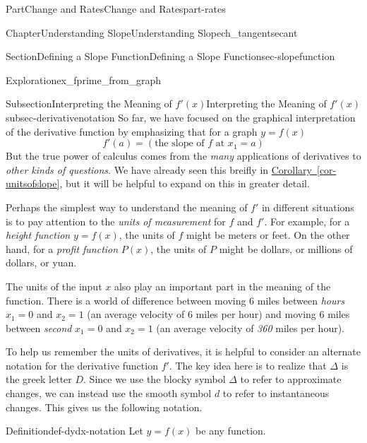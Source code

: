 \documentclass[oneside,10pt,]{tufte-book}
\newcommand{\xreffont}{\relax}
\numberwithin{equation}{chapter}
\begin{document}
\begin{partptx}{Part}{Change and Rates}{}{Change and Rates}{}{}{part-rates}
\begin{chapterptx}{Chapter}{Understanding Slope}{}{Understanding Slope}{}{}{ch_tangentsecant}
\begin{sectionptx}{Section}{Defining a Slope Function}{}{Defining a Slope Function}{}{}{sec-slopefunction}
\begin{exploration}{Exploration}{}{ex_fprime_from_graph}
\begin{enumerate}[font=\bfseries,label=(\alph*),ref=\alph*]
\begin{image}{0.125}{0.75}{0.125}{}
{\begin{tikzpicture}
\end{tikzpicture}
}%
\end{image}%
\end{enumerate}%
\end{exploration}%
%
%
\typeout{************************************************}
\typeout{************************************************}
%
\begin{subsectionptx}{Subsection}{Interpreting the Meaning of \(f'(x)\)}{}{Interpreting the Meaning of \(f'(x)\)}{}{}{subsec-derivativenotation}
So far, we have focused on the graphical interpretation of the derivative function by emphasizing that for a graph \(y=f(x)\)%
\begin{equation*}
f'(a) = (\text{the slope of } f \text{ at }x_1=a)
\end{equation*}
But the true power of calculus comes from the \emph{many} applications of derivatives to \emph{other kinds of questions}. We have already seen this breifly in \hyperref[cor-unitsofslope]{Corollary~{\xreffont\ref{cor-unitsofslope}}}, but it will be helpful to expand on this in greater detail.%
\par
Perhaps the simplest way to understand the meaning of \(f'\) in different situations is to pay attention to the \emph{units of measurement} for \(f\) and \(f'\). For example, for a \emph{height function} \(y=f(x)\), the units of \(f\) might be meters or feet. On the other hand, for a \emph{profit function} \(P(x)\), the units of \(P\) might be dollars, or millions of dollars, or yuan.%
\par
The units of the input \(x\) also play an important part in the meaning of the function. There is a world of difference between moving 6 miles between \emph{hours} \(x_1=0\) and \(x_2=1\) (an average velocity of 6 miles per hour) and moving 6 miles between \emph{second} \(x_1=0\) and \(x_2=1\) (an average velocity of \emph{360} miles per hour).%
\par
To help us remember the units of derivatives, it is helpful to consider an alternate notation for the derivative function \(f'\). The key idea here is to realize that \(\Delta\) is the greek letter \(D\).  Since we use the blocky symbol \(\Delta\) to refer to approximate changes, we can instead use the smooth symbol \(d\) to refer to instantaneous changes.  This gives us the following notation.%
\begin{definition}{Definition}{}{def-dydx-notation}%
Let \(y=f(x)\) be any function.%
\par

\end{definition}
\end{subsectionptx}
\end{sectionptx}
\end{chapterptx}
\end{partptx}
\end{document}

